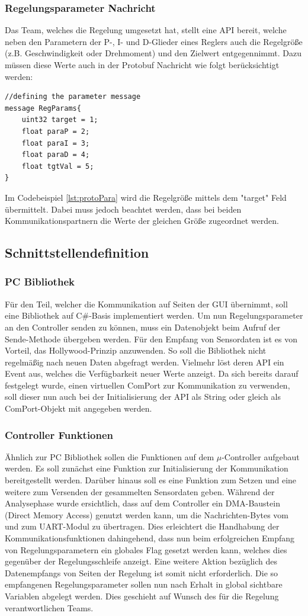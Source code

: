 \subsubsection{Regelungsparameter Nachricht}
Das Team, welches die Regelung umgesetzt hat, stellt eine API bereit, welche neben den Parametern der P-, I- und D-Glieder eines Reglers auch die Regelgröße (z.B. Geschwindigkeit oder Drehmoment) und den Zielwert entgegennimmt. Dazu müssen diese Werte auch in der Protobuf Nachricht wie folgt berücksichtigt werden:
\begin{lstlisting}[frame=single, caption=Beschreibung der Parameter Nachricht, label=lst:protoPara]
//defining the parameter message
message RegParams{
	uint32 target = 1;
	float paraP = 2;
	float paraI = 3;
	float paraD = 4;
	float tgtVal = 5;
}
\end{lstlisting}
Im Codebeispiel \ref{lst:protoPara} wird die Regelgröße mittels dem "target" Feld übermittelt. Dabei muss jedoch beachtet werden, dass bei beiden Kommunikationspartnern die Werte der gleichen Größe zugeordnet werden.
\subsection{Schnittstellendefinition}
\subsubsection{PC Bibliothek}
Für den Teil, welcher die Kommunikation auf Seiten der GUI übernimmt, soll eine Bibliothek auf C\#-Basis implementiert werden. Um nun Regelungsparameter an den Controller senden zu können, muss ein Datenobjekt beim Aufruf der Sende-Methode übergeben werden. Für den Empfang von Sensordaten ist es von Vorteil, das Hollywood-Prinzip anzuwenden. So soll die Bibliothek nicht regelmäßig nach neuen Daten abgefragt werden. Vielmehr löst deren API ein Event aus, welches die Verfügbarkeit neuer Werte anzeigt. Da sich bereits darauf festgelegt wurde, einen virtuellen ComPort zur Kommunikation zu verwenden, soll dieser nun auch bei der Initialisierung der API als String oder gleich als ComPort-Objekt mit angegeben werden. 
\subsubsection{Controller Funktionen}
Ähnlich zur PC Bibliothek sollen die Funktionen auf dem $\mu$-Controller aufgebaut werden. Es soll zunächst eine Funktion zur Initialisierung der Kommunikation bereitgestellt werden. Darüber hinaus soll es eine Funktion zum Setzen und eine weitere zum Versenden der gesammelten Sensordaten geben. Während der Analysephase wurde ersichtlich, dass auf dem Controller ein DMA-Baustein (Direct Memory Access) genutzt werden kann, um die Nachrichten-Bytes vom und zum UART-Modul zu übertragen. Dies erleichtert die Handhabung der Kommunikationsfunktionen dahingehend, dass nun beim erfolgreichen Empfang von Regelungsparametern ein globales Flag gesetzt werden kann, welches dies gegenüber der Regelungsschleife anzeigt. Eine weitere Aktion bezüglich des Datenempfangs von Seiten der Regelung ist somit nicht erforderlich. Die so empfangenen Regelungsparameter sollen nun nach Erhalt in global sichtbare Variablen abgelegt werden. Dies geschieht auf Wunsch des für die Regelung verantwortlichen Teams.
